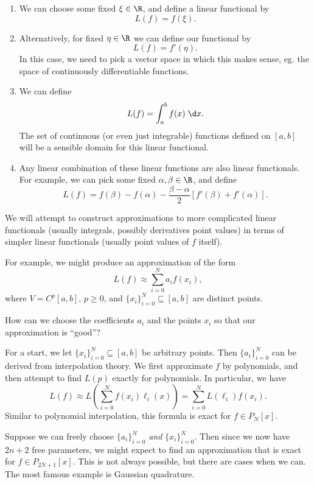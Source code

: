 \documentclass[a4paper]{article}
\begin{document}
\begin{eg}\leavevmode
  \begin{enumerate}
    \item We can choose some fixed $\xi \in \R$, and define a linear functional by
      \[
        L(f) = f(\xi).
      \]
    \item Alternatively, for fixed $\eta \in \R$ we can define our functional by
      \[
        L(f) = f'(\eta).
      \]
      In this case, we need to pick a vector space in which this makes sense, eg. the space of continuously differentiable functions.
    \item We can define
      \[
        L(f) = \int_a^b f(x)\;\d x.
      \]
      The set of continuous (or even just integrable) functions defined on $[a, b]$ will be a sensible domain for this linear functional.
    \item Any linear combination of these linear functions are also linear functionals. For example, we can pick some fixed $\alpha, \beta \in \R$, and define
      \[
        L(f) = f(\beta) - f(\alpha) - \frac{\beta - \alpha}{2} [f'(\beta) + f'(\alpha)]. %
      \]
  \end{enumerate}
\end{eg}

We will attempt to construct approximations to more complicated linear functionals (usually integrals, possibly derivatives point values) in terms of simpler linear functionals (usually point values of $f$ itself).

For example, we might produce an approximation of the form
\[
  L(f) \approx \sum_{i = 0}^N a_i f(x_i),
\]
where $V = C^p[a, b]$, $p \geq 0$, and $\{x_i\}_{i = 0}^N \subseteq [a, b]$ are distinct points.

How can we choose the coefficients $a_i$ and the points $x_i$ so that our approximation is ``good''?

For a start, we let $ \{x_i\}_{i = 0}^N \subseteq [a, b]$ be arbitrary points. Then $\{a_i\}_{i = 0}^N$ can be derived from interpolation theory. We first approximate $f$ by polynomials, and then attempt to find $L(p)$ exactly for polynomials. In particular, we have
\[
  L(f) \approx L\left(\sum_{i = 0}^N f(x_i) \ell_i(x)\right) = \sum_{i = 0}^N L(\ell_i) f(x_i).
\]
Similar to polynomial interpolation, this formula is exact for $f \in P_N[x]$.

Suppose we can freely choose $\{a_i\}_{i = 0}^N$ \emph{and} $\{x_i\}_{i = 0}^N$. Then since we now have $2n + 2$ free parameters, we might expect to find an approximation that is exact for $f \in P_{2N + 1}[x]$. This is not always possible, but there are cases when we can. The most famous example is Gaussian quadrature.
\end{document}
